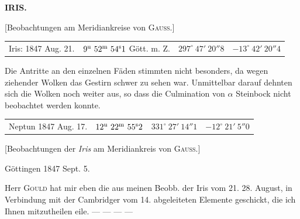 \clearpage
\noindent{}%
%
\parbox[t]{\dimexpr\linewidth-24mm\relax}{\centering\footnotesize\bfseries IRIS.\par}%
\makebox[12mm][r]{}\par\nobreak\medskip
{}
\begin{center}[Beobachtungen am Meridiankreise von \textsc{Gauss}.]\end{center}

\begin{center}
\small
\setlength{\tabcolsep}{3pt}
\begin{tabular}{lrll}
Iris: 1847 Aug. 21. & $9^{\rm u}\ 52^{\rm m}\ 54^{\rm s}1$ Gött. m. Z. & $297^\circ\ 47'\ 20''8$ & $-13^\circ\ 42'\ 20''4$ \\
\end{tabular}
\end{center}

Die Antritte an den einzelnen Fäden stimmten nicht besonders, da wegen ziehender Wolken das Gestirn schwer zu sehen war. Unmittelbar darauf dehnten sich die Wolken noch weiter aus, so dass die Culmination von $\alpha$ Steinbock nicht beobachtet werden konnte.

\begin{center}
\small
\setlength{\tabcolsep}{4pt}
\begin{tabular}{lrrr}
Neptun 1847 Aug. 17. & $12^{\rm u}\ 22^{\rm m}\ 55^{\rm s}2$ & $331^\circ\ 27'\ 14''1$ & $-12^\circ\ 21'\ 5''0$ \\
\end{tabular}
\end{center}

\par{}\bigskip
\hypertarget{native-479-lower}{}
\begin{center}[Beobachtungen der \emph{Iris} am Meridiankreis von \textsc{Gauss}.]\end{center}
\begin{flushright}Göttingen 1847 Sept. 5.\end{flushright}

Herr \textsc{Gould} hat mir eben die aus meinen Beobb. der Iris vom 21. 28. August, in Verbindung mit der Cambridger vom 14. abgeleiteten Elemente geschickt, die ich Ihnen mitzutheilen eile. --- --- --- ---

